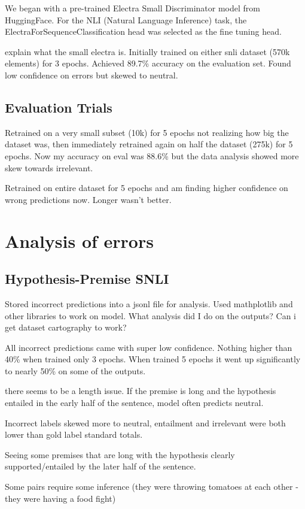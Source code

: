\documentclass[11pt]{article}
\begin{document}
We began with a pre-trained Electra Small Discriminator model from HuggingFace. For the NLI (Natural Language Inference) task, the ElectraForSequenceClassification head was selected as the fine tuning head. 

explain what the small electra is.
Initially trained on either snli dataset (570k elements) for 3 epochs. Achieved 89.7\% accuracy on the evaluation set. Found low confidence on errors but skewed to neutral.
\subsection{Evaluation Trials}
Retrained on a very small subset (10k) for 5 epochs not realizing how big the dataset was, then immediately retrained again on half the dataset (275k) for 5 epochs. Now my accuracy on eval was 88.6\% but the data analysis showed more skew towards irrelevant.

Retrained on entire dataset for 5 epochs and am finding higher confidence on wrong predictions now. Longer wasn't better.

\section{Analysis of errors}
\subsection{Hypothesis-Premise SNLI}

Stored incorrect predictions into a jsonl file for analysis. Used mathplotlib and other libraries to work on model.
What analysis did I do on the outputs? Can i get dataset cartography to work?

All incorrect predictions came with super low confidence. Nothing higher than 40\% when trained only 3 epochs. When trained 5 epochs it went up significantly to nearly 50\% on some of the outputs.

there seems to be a length issue. If the premise is long and the hypothesis entailed in the early half of the sentence, model often predicts neutral.

Incorrect labels skewed more to neutral, entailment and irrelevant were both lower than gold label standard totals.

Seeing some premises that are long with the hypothesis clearly supported/entailed by the later half of the sentence. 

Some pairs require some inference (they were throwing tomatoes at each other - they were having a food fight)
\end{document}
